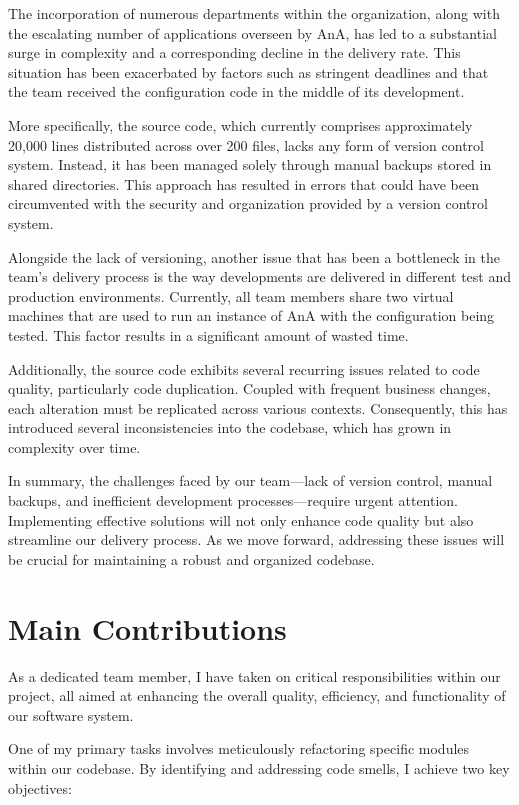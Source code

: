 The incorporation of numerous departments within the organization, along with the escalating number of applications overseen by AnA, has led to a substantial surge in complexity and a corresponding decline in the delivery rate. This situation has been exacerbated by factors such as stringent deadlines and that the team received the configuration code in the middle of its development.

More specifically, the source code, which currently comprises approximately 20,000 lines distributed across over 200 files, lacks any form of version control system. Instead, it has been managed solely through manual backups stored in shared directories. This approach has resulted in errors that could have been circumvented with the security and organization provided by a version control system.

Alongside the lack of versioning, another issue that has been a bottleneck in the team’s delivery process is the way developments are delivered in different test and production environments. Currently, all team members share two virtual machines that are used to run an instance of AnA with the configuration being tested. This factor results in a significant amount of wasted time.

Additionally, the source code exhibits several recurring issues related to code quality, particularly code duplication. Coupled with frequent business changes, each alteration must be replicated across various contexts. Consequently, this has introduced several inconsistencies into the codebase, which has grown in complexity over time.

In summary, the challenges faced by our team—lack of version control, manual backups, and inefficient development processes—require urgent attention. Implementing effective solutions will not only enhance code quality but also streamline our delivery process. As we move forward, addressing these issues will be crucial for maintaining a robust and organized codebase.

\section{Main Contributions}

As a dedicated team member, I have taken on critical responsibilities within our project, all aimed at enhancing the overall quality, efficiency, and functionality of our software system.

One of my primary tasks involves meticulously refactoring specific modules within our codebase. By identifying and addressing code smells, I achieve two key objectives:


